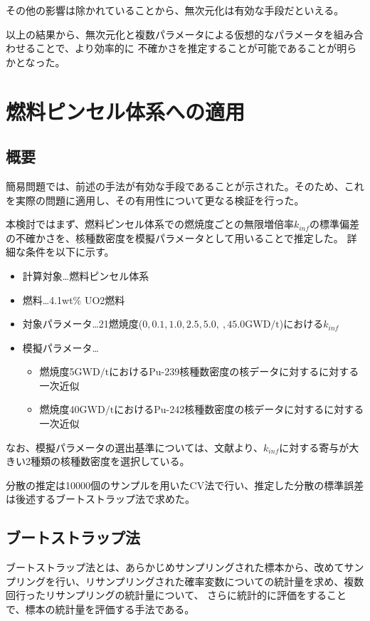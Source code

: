 \documentclass[a4paper,11pt,titlepage,uplatex]{jsreport}
\begin{document}
その他の影響は除かれていることから、無次元化は有効な手段だといえる。

以上の結果から、無次元化と複数パラメータによる仮想的なパラメータを組み合わせることで、より効率的に
不確かさを推定することが可能であることが明らかとなった。
\newpage

\chapter{燃料ピンセル体系への適用}
\section{概要}
簡易問題では、前述の手法が有効な手段であることが示された。そのため、これを実際の問題に適用し、その有用性について更なる検証を行った。

本検討ではまず、燃料ピンセル体系での燃焼度ごとの無限増倍率$k_{inf}$の標準偏差の不確かさを、核種数密度を模擬パラメータとして用いることで推定した。
詳細な条件を以下に示す。

\begin{itemize}
  \item 計算対象…燃料ピンセル体系
  \item 燃料…4.1wt\% \space UO2燃料
  \item 対象パラメータ…21燃焼度($0,0.1,1.0,2.5,5.0,~,45.0 \mathrm{GWD/t}$)における$k_{inf}$
  \item 模擬パラメータ…\begin{itemize}
    \item 燃焼度5$\mathrm{GWD/t}$におけるPu-239核種数密度の核データに対するに対する一次近似
    \item 燃焼度40$\mathrm{GWD/t}$におけるPu-242核種数密度の核データに対するに対する一次近似
  \end{itemize}
\end{itemize}

なお、模擬パラメータの選出基準については、文献\cite{Harada}より、$k_{inf}$に対する寄与が大きい2種類の核種数密度を選択している。

分散の推定は10000個のサンプルを用いたCV法で行い、推定した分散の標準誤差は後述するブートストラップ法で求めた。

\section{ブートストラップ法}
ブートストラップ法とは、あらかじめサンプリングされた標本から、改めてサンプリングを行い、リサンプリングされた確率変数についての統計量を求め、複数回行ったリサンプリングの統計量について、
さらに統計的に評価をすることで、標本の統計量を評価する手法である\cite{efron1986bootstrap}\cite{endo2015confidence}。
\end{document}

